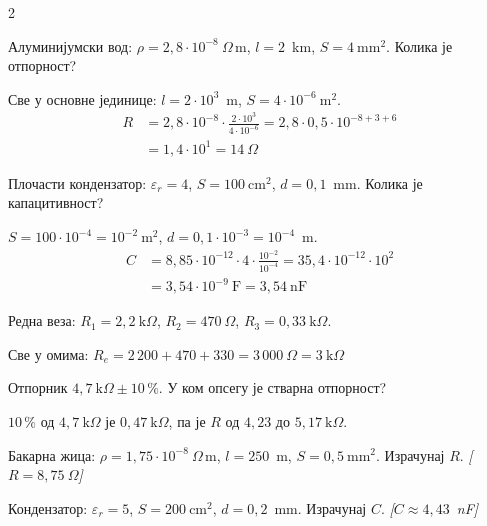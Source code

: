 \documentclass[10pt]{article}
\begin{document}
\begin{multicols}{2}

\begin{primer}
Алуминијумски вод: $\rho = 2{,}8\cdot 10^{-8}~\Omega\,\text{m}$, $l = 2$~km,
$S = 4~\text{mm}^2$. Колика је отпорност?

Све у основне јединице: $l = 2\cdot 10^{3}$~m, $S = 4\cdot 10^{-6}~\text{m}^2$.
\begin{align*}
R &= 2{,}8\cdot 10^{-8}\cdot\frac{2\cdot 10^{3}}{4\cdot 10^{-6}}
   = 2{,}8\cdot 0{,}5\cdot 10^{-8+3+6}\\
  &= 1{,}4\cdot 10^{1} = 14~\Omega
\end{align*}
\end{primer}

\begin{primer}
Плочасти кондензатор: $\varepsilon_r = 4$, $S = 100~\text{cm}^2$, $d = 0{,}1$~mm.
Колика је капацитивност?

$S = 100\cdot 10^{-4} = 10^{-2}~\text{m}^2$, \; $d = 0{,}1\cdot 10^{-3} = 10^{-4}$~m.
\begin{align*}
C &= 8{,}85\cdot 10^{-12}\cdot 4\cdot\frac{10^{-2}}{10^{-4}}
   = 35{,}4\cdot 10^{-12}\cdot 10^{2}\\
  &= 3{,}54\cdot 10^{-9}~\text{F} = 3{,}54~\text{nF}
\end{align*}
\end{primer}

\begin{primer}
Редна веза: $R_1 = 2{,}2~\text{k}\Omega$, $R_2 = 470~\Omega$, $R_3 = 0{,}33~\text{k}\Omega$.

Све у омима: $R_e = 2\,200 + 470 + 330 = 3\,000~\Omega = 3~\text{k}\Omega$
\end{primer}

\begin{primer}
Отпорник $4{,}7~\text{k}\Omega \pm 10\,\%$. У ком опсегу је стварна отпорност?

$10\,\%$ од $4{,}7~\text{k}\Omega$ је $0{,}47~\text{k}\Omega$, па је
$R$ од $4{,}23$ до $5{,}17~\text{k}\Omega$.
\end{primer}

\begin{zadatak}
Бакарна жица: $\rho = 1{,}75\cdot 10^{-8}~\Omega\,\text{m}$, $l = 250$~m,
$S = 0{,}5~\text{mm}^2$. Израчунај $R$.
\hfill\textit{[$R = 8{,}75~\Omega$]}
\end{zadatak}

\begin{zadatak}
Кондензатор: $\varepsilon_r = 5$, $S = 200~\text{cm}^2$, $d = 0{,}2$~mm. Израчунај $C$.
\hfill\textit{[$C \approx 4{,}43$~nF]}
\end{zadatak}


\end{multicols}
\end{document}
